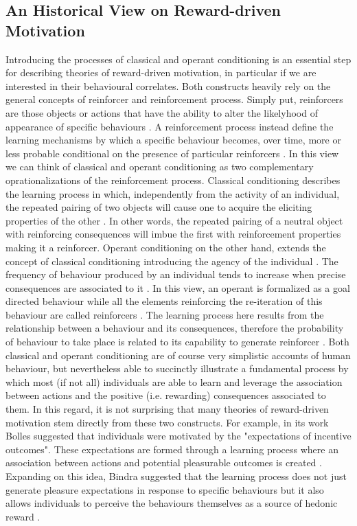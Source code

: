 \subsection{An Historical View on Reward-driven Motivation}
\label{motivation_hist}
Introducing the processes of classical and operant conditioning is an essential step for describing theories of reward-driven motivation, in particular if we are interested in their behavioural correlates. Both constructs heavily rely on the general concepts of reinforcer and reinforcement process. Simply put, reinforcers are those objects or actions that have the ability to alter the likelyhood of appearance of specific behaviours \cite{kling1971woodworth,skinner1953science,squire2012fundamental}. A reinforcement process instead define the learning mechanisms by which a specific behaviour becomes, over time, more or less probable conditional on the presence of particular reinforcers \cite{kling1971woodworth}. In this view we can think of classical and operant conditioning as two complementary oprationalizations of the reinforcement process. 
Classical conditioning describes the learning process in which, independently from the activity of an individual, the repeated pairing of two objects will cause one to acquire the eliciting properties of the other \cite{squire2012fundamental}. In other words, the repeated pairing of a neutral object with reinforcing consequences will imbue the first with reinforcement properties making it a reinforcer. 
Operant conditioning on the other hand, extends the concept of classical conditioning introducing the agency of the individual \cite{skinner1953science}. The frequency of behaviour produced by an individual tends to increase when precise consequences are associated to it \cite{skinner1953science}. In this view, an operant is formalized as a goal directed behaviour while all the elements reinforcing the re-iteration of this behaviour are called reinforcers \cite{skinner1953science}. The learning process here results from the relationship between a behaviour and its consequences, therefore the probability of behaviour to take place is related to its capability to generate reinforcer \cite{kling1971woodworth}. 
Both classical and operant conditioning are of course very simplistic accounts of human behaviour, but nevertheless able to succinctly illustrate a fundamental process by which most (if not all) individuals are able to learn and leverage the association between actions and the positive (i.e. rewarding) consequences associated to them. In this regard, it is not surprising that many theories of reward-driven motivation stem directly from these two constructs. For example, in its work Bolles \cite{bolles1972reinforcement} suggested that individuals were motivated by the "expectations of incentive outcomes". These expectations are formed through a learning process where an association between actions and potential pleasurable outcomes is created \cite{bolles1972reinforcement,berridge2004motivation}. Expanding on this idea, Bindra \cite{bindra1978adaptive} suggested that the learning process does not just generate pleasure expectations in response to specific behaviours but it also allows individuals to perceive the behaviours themselves as a source of hedonic reward \cite{bindra1978adaptive,berridge2004motivation}.
